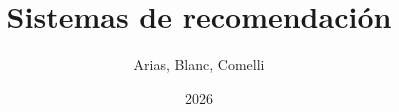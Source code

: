 \documentclass[a4paper,12pt,oneside]{book}
\begin{document}
\author{Arias, Blanc, Comelli}
\title{Sistemas de recomendación}
\date{2026}

\frontmatter
\maketitle
\tableofcontents

\mainmatter




\backmatter
\end{document}
